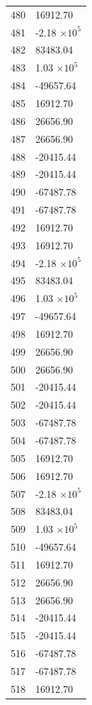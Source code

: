 \documentclass[a4paper,11pt]{article}
\begin{document}
\begin{center}
\begin{longtable}{|R{1.5cm}|R{2.5cm}|}
  480 &     16912.70 \\
  481 &        -2.18 $\times 10^{           5}$ \\
  482 &     83483.04 \\
  483 &         1.03 $\times 10^{           5}$ \\
  484 &    -49657.64 \\
  485 &     16912.70 \\
  486 &     26656.90 \\
  487 &     26656.90 \\
  488 &    -20415.44 \\
  489 &    -20415.44 \\
  490 &    -67487.78 \\
  491 &    -67487.78 \\
  492 &     16912.70 \\
  493 &     16912.70 \\
  494 &        -2.18 $\times 10^{           5}$ \\
  495 &     83483.04 \\
  496 &         1.03 $\times 10^{           5}$ \\
  497 &    -49657.64 \\
  498 &     16912.70 \\
  499 &     26656.90 \\
  500 &     26656.90 \\
  501 &    -20415.44 \\
  502 &    -20415.44 \\
  503 &    -67487.78 \\
  504 &    -67487.78 \\
  505 &     16912.70 \\
  506 &     16912.70 \\
  507 &        -2.18 $\times 10^{           5}$ \\
  508 &     83483.04 \\
  509 &         1.03 $\times 10^{           5}$ \\
  510 &    -49657.64 \\
  511 &     16912.70 \\
  512 &     26656.90 \\
  513 &     26656.90 \\
  514 &    -20415.44 \\
  515 &    -20415.44 \\
  516 &    -67487.78 \\
  517 &    -67487.78 \\
  518 &     16912.70 \\

\end{longtable}
\end{center}
\end{document}
